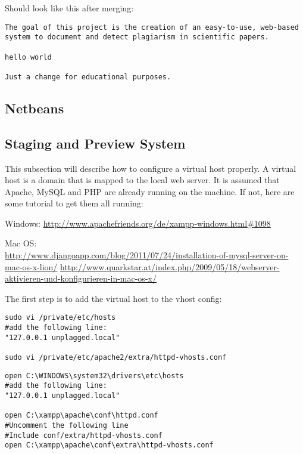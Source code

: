 Should look like this after merging:

\begin{lstlisting}[caption=Creating branches]
The goal of this project is the creation of an easy-to-use, web-based
system to document and detect plagiarism in scientific papers.

hello world

Just a change for educational purposes.
\end{lstlisting}

\subsection{Netbeans}

\subsection{Staging and Preview System}

This subsection will describe how to configure a virtual host properly. A virtual host is a domain that is mapped to the local web server. It is assumed that Apache, MySQL and PHP are already running on the machine. If not, here are some tutorial to get them all running:

Windows: \url{http://www.apachefriends.org/de/xampp-windows.html#1098}

Mac OS:\\
\url{http://www.djangoapp.com/blog/2011/07/24/installation-of-mysql-server-on-mac-os-x-lion/} \url{http://www.quarkstar.at/index.php/2009/05/18/webserver-aktivieren-und-konfigurieren-in-mac-os-x/}

The first step is to add the virtual host to the vhost config: 

\begin{lstlisting}[caption=Mac OS X: Creating virtual host]
sudo vi /private/etc/hosts
#add the following line:
"127.0.0.1 unplagged.local"

sudo vi /private/etc/apache2/extra/httpd-vhosts.conf
\end{lstlisting}

\begin{lstlisting}[caption=Windows: Creating a virtual host]
open C:\WINDOWS\system32\drivers\etc\hosts
#add the following line:
"127.0.0.1 unplagged.local"

open C:\xampp\apache\conf\httpd.conf
#Uncomment the following line
#Include conf/extra/httpd-vhosts.conf
open C:\xampp\apache\conf\extra\httpd-vhosts.conf
\end{lstlisting}

